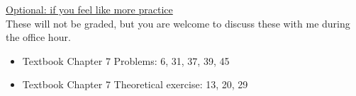 \documentclass[11pt]{article}
\begin{document}
\vspace{12pt}

\underline{Optional: if you feel like more practice}\\
These will not be graded, but you are welcome to discuss these with me during the office hour.

\begin{itemize}


\item Textbook  Chapter 7 Problems: 6, 31, 37, 39, 45
\item Textbook  Chapter 7 Theoretical exercise: 13, 20, 29

\end{itemize}
\end{document}
